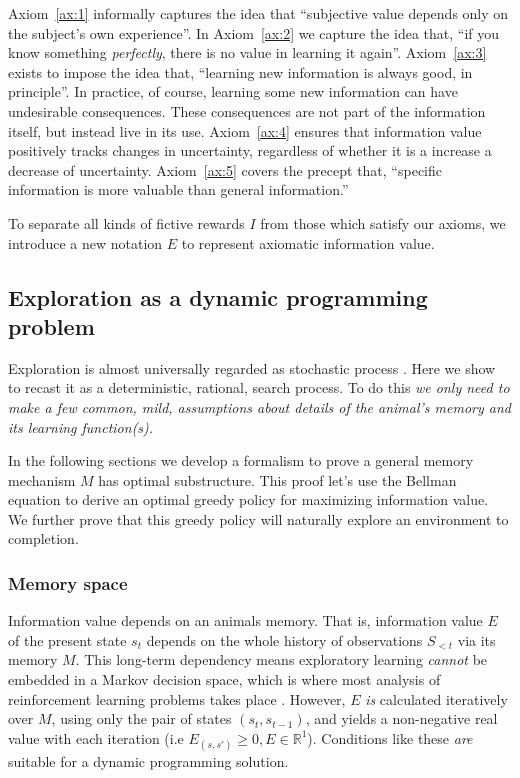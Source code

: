 \documentclass[9pt,twocolumn,twoside]{pnas-new}
\begin{document}
Axiom~\ref{ax:1} informally captures the idea that ``subjective value depends only on the subject's own experience''.  In Axiom~\ref{ax:2} we capture the idea that, ``if you know something \textit{perfectly}, there is no value in learning it again''. Axiom~\ref{ax:3} exists to impose the idea that, ``learning new information is always good, in principle''. In practice, of course, learning some new information can have undesirable consequences. These consequences are not part of the information itself, but instead live in its use. Axiom~\ref{ax:4} ensures that information value positively tracks changes in uncertainty, regardless of whether it is a increase a decrease of uncertainty. Axiom~\ref{ax:5} covers the precept that, ``specific information is more valuable than general information.'' 

To separate all kinds of fictive rewards $I$ from those which satisfy our axioms, we introduce a new notation $E$ to represent axiomatic information value.

\subsection*{Exploration as a dynamic programming problem}
Exploration is almost universally regarded as stochastic process \cite{Sutton2018,Jaegle}. Here we show to recast it as a deterministic, rational, search process. To do this \textit{we only need to make a few common, mild, assumptions about details of the animal's memory and its learning function(s).} 

In the following sections we develop a formalism to prove a general memory mechanism $M$ has optimal substructure. This proof let's use the Bellman equation \cite{Bellman} to derive an optimal greedy policy for maximizing information value. We further prove that this greedy policy will naturally explore an environment to completion. 


\subsubsection*{Memory space}
Information value depends on an animals memory. That is, information value $E$ of the present state $s_t$ depends on the whole history of observations $S_{<t}$ via its memory $M$. This long-term dependency means exploratory learning \textit{cannot} be embedded in a Markov decision space, which is where most analysis of reinforcement learning problems takes place \cite{Sutton2018a}. However, $E$ \textit{is} calculated iteratively over $M$, using only the pair of states $(s_t, s_{t-1})$, and yields a non-negative real value with each iteration (i.e $E_{(s,s')} \ge 0, E \in \mathbb{R}^1$). Conditions like these \textit{are} suitable for a dynamic programming solution. 
\end{document}
